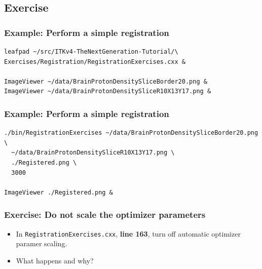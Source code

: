 \subsection{Exercise}


\begin{frame}[fragile]
\frametitle{Example: Perform a simple registration}
\begin{verbatim}
leafpad ~/src/ITKv4-TheNextGeneration-Tutorial/\
Exercises/Registration/RegistrationExercises.cxx &

ImageViewer ~/data/BrainProtonDensitySliceBorder20.png &
ImageViewer ~/data/BrainProtonDensitySliceR10X13Y17.png &
\end{verbatim}
\end{frame}

\begin{frame}[fragile]
\frametitle{Example: Perform a simple registration}
\begin{verbatim}
./bin/RegistrationExercises ~/data/BrainProtonDensitySliceBorder20.png \
  ~/data/BrainProtonDensitySliceR10X13Y17.png \
  ./Registered.png \
  3000

ImageViewer ./Registered.png &
\end{verbatim}
\end{frame}

\begin{frame}[fragile]
\frametitle{Exercise: Do not scale the optimizer parameters}
  \begin{itemize}
    \item In \texttt{RegistrationExercises.cxx}, \textbf{line 163}, turn off
      automatic optimizer paramer scaling.
    \item What happens and why?
  \end{itemize}
\end{frame}
